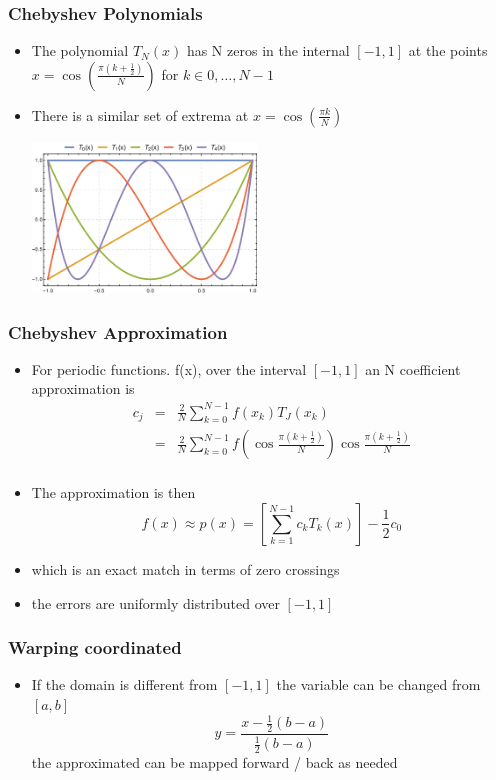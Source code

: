 \documentclass[10pt]{beamer}
\begin{document}
\begin{frame}
  \frametitle{Chebyshev Polynomials}
  \begin{itemize}
  \item The polynomial $T_N(x)$ has N zeros in the internal $[-1,1]$ at the
    points $x=\cos(\frac{\pi (k+\frac{1}{2})}{N})$ for $k \in 0, \ldots, N-1$
  \item There is a similar set of extrema at $x = \cos(\frac{\pi k}{N})$
    \centerline{\includegraphics[height=4cm]{Chebyshev}}
  \end{itemize}
\end{frame}

\begin{frame}
  \frametitle{Chebyshev Approximation}
  \begin{itemize}
  \item For periodic functions. f(x), over the interval $[-1,1]$ an N coefficient approximation is
    \[
      \begin{array}{rcl}
      c_j & = & \frac{2}{N} \sum_{k=0}^{N-1} f(x_k) T_J(x_k)\\
          & = & \frac{2}{N} \sum_{k=0}^{N-1} f\left( \cos \frac{\pi (k+\frac{1}{2})}{N} \right) \cos \frac{\pi (k+\frac{1}{2})}{N} \\
      \end{array}
    \]
  \item The approximation is then
    \[
      f(x) \approx p(x) = \left[ \sum_{k=1}^{N-1} c_k T_k(x) \right] - \frac{1}{2} c_0
    \]
  \item which is an exact match in terms of zero crossings
  \item the errors are uniformly distributed over $[-1,1]$
  \end{itemize}
\end{frame}

\begin{frame}
  \frametitle{Warping coordinated}
  \begin{itemize}
  \item If the domain is different from $[-1,1]$ the variable can be changed from $[a,b]$
    \[
      y = \frac{x -\frac{1}{2} (b-a)}{\frac{1}{2}(b-a)}
    \]
    the approximated can be mapped forward / back as needed
  \end{itemize}
\end{frame}
\end{document}
